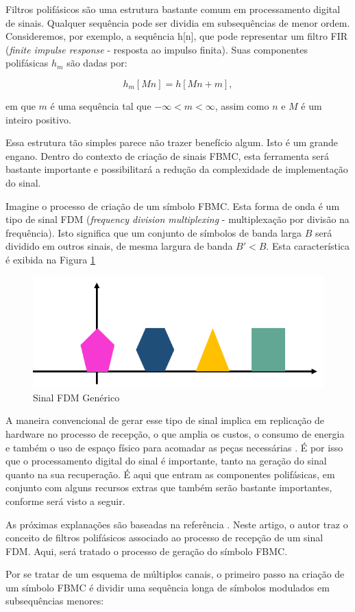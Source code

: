 Filtros polifásicos são uma estrutura bastante comum em processamento digital de sinais. Qualquer sequência pode ser dividia em subsequências de menor ordem. Consideremos, por exemplo, a sequência h[n], que pode representar um filtro FIR (\textit{finite impulse response} - resposta ao impulso finita). Suas componentes polifásicas $h_{m}$ são dadas por:

\begin{equation}
h_{m}[Mn] = h[Mn + m],
\end{equation}

em que $m$ é uma sequência tal que $-\infty < m < \infty$, assim como $n$ e $M$ é um inteiro positivo. 
\par Essa estrutura tão simples parece não trazer benefício algum. Isto é um grande engano. Dentro do contexto de criação de sinais FBMC, esta ferramenta será bastante importante e possibilitará a redução da complexidade de implementação do sinal.

\par Imagine o processo de criação de um símbolo FBMC. Esta forma de onda é um tipo de sinal FDM (\textit{frequency division multiplexing} - multiplexação por divisão na frequência). Isto significa que um conjunto de símbolos de banda larga 
$B$ será dividido em outros sinais, de mesma largura de banda $B' < B$. Esta característica é exibida na Figura \ref{espectro FDM}

\begin{figure}[h!]
\centering
\includegraphics[width=4.5in]{Filtrado.png}
\caption{Sinal FDM Genérico}
\label{espectro FDM}
\end{figure}

\par A maneira convencional de gerar esse tipo de sinal implica em replicação de hardware no processo de recepção, o que amplia os custos, o consumo de energia e também o uso de espaço físico para acomadar as peças necessárias \cite{Krishna}. É por isso que o processamento digital do sinal é importante, tanto na geração do sinal quanto na sua recuperação. É aqui que entram as componentes polifásicas, em conjunto com alguns recursos extras que também serão bastante importantes, conforme será visto a seguir.
\par As próximas explanações são baseadas na referência \cite{Krishna}. Neste artigo, o autor traz o conceito de filtros polifásicos associado ao processo de recepção de um sinal FDM. Aqui, será tratado o processo de geração do símbolo FBMC.
\par Por se tratar de um esquema de múltiplos canais, o primeiro passo na criação de um símbolo FBMC é dividir uma sequência longa de símbolos modulados em subsequências menores: 

